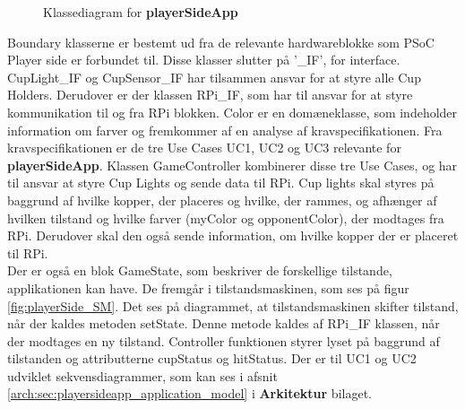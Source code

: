 \documentclass[Rapport/Rapport_main.tex]{subfiles}
\begin{document}
\begin{figure}[H]
    \centering
    \centering
    \caption{Klassediagram for \textbf{playerSideApp}}
    \label{fig:CD_PlayerSide}
\end{figure}
Boundary klasserne er bestemt ud fra de relevante hardwareblokke som PSoC Player side er forbundet til. Disse klasser slutter på '\_IF', for interface. CupLight\_IF og CupSensor\_IF har tilsammen ansvar for at styre alle Cup Holders. Derudover er der klassen RPi\_IF, som har til ansvar for at styre kommunikation til og fra RPi blokken. Color er en domæneklasse, som indeholder information om farver og fremkommer af en analyse af kravspecifikationen. Fra kravspecifikationen er de tre Use Cases UC1, UC2 og UC3 relevante for \textbf{playerSideApp}. Klassen GameController kombinerer disse tre Use Cases, og har til ansvar at styre Cup Lights og sende data til RPi. Cup lights skal styres på baggrund af hvilke kopper, der placeres og hvilke, der rammes, og afhænger af hvilken tilstand og hvilke farver (myColor og opponentColor), der modtages fra RPi. Derudover skal den også sende information, om hvilke kopper der er placeret til RPi.\\

Der er også en blok GameState, som beskriver de forskellige tilstande, applikationen kan have. De fremgår i tilstandsmaskinen, som ses på figur \ref{fig:playerSide_SM}. Det ses på diagrammet, at tilstandsmaskinen skifter tilstand, når der kaldes metoden setState. Denne metode kaldes af RPi\_IF klassen, når der modtages en ny tilstand. Controller funktionen styrer lyset på baggrund af tilstanden og attributterne cupStatus og hitStatus. Der er til UC1 og UC2 udviklet sekvensdiagrammer, som kan ses i afsnit \autoref{arch:sec:playersideapp_application_model} i \textbf{Arkitektur} bilaget.      
\end{document}

